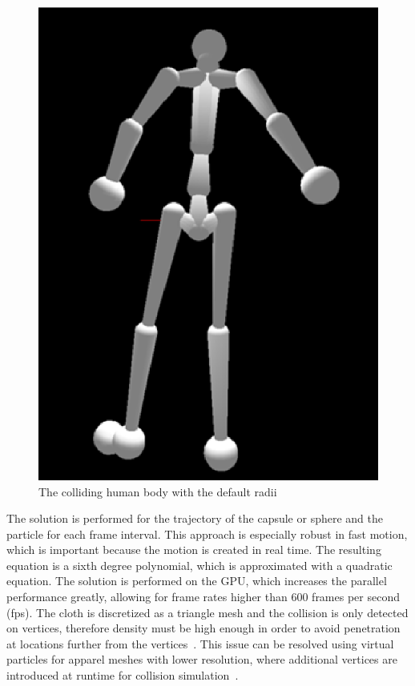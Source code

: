 \documentclass[number,preprint,review,12pt]{elsarticle}
\begin{document}
\begin{figure}[htbp]
	\begin{center}
	\includegraphics[width=0.5\textwidt\textwidth]{./figures/colliders.eps}
	\end{center}
	\caption{The colliding human body with the default radii}
	\label{fig:colliders}
\end{figure}

The solution is performed for the trajectory of the capsule or sphere and the particle for each frame interval. This approach is especially robust in fast motion, which is important because the motion is created in real time. The resulting equation is a sixth degree polynomial, which is approximated with a quadratic equation. The solution is performed on the GPU, which increases the parallel performance greatly, allowing for frame rates higher than 600 frames per second (fps). The cloth is discretized as a triangle mesh and the collision is only detected on vertices, therefore density must be high enough in order to avoid penetration at locations further from the vertices~\cite{Kim2011,Tonge2010}. This issue can be resolved using virtual particles for apparel meshes with lower resolution, where additional vertices are introduced at runtime for collision simulation~\cite{Kim2011}.
\end{document}
